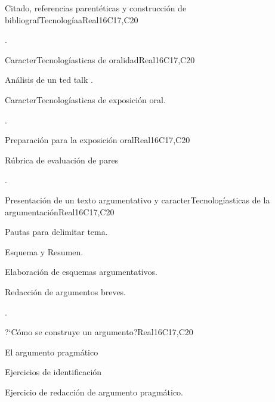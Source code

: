 \begin{syllabus}
\begin{unit}{Citado, referencias parentéticas y construcción de bibliografTecnologíaa}{}{Real}{16}{C17,C20}
  \begin{learningoutcomes}
   \item .%
  \end{learningoutcomes}
\end{unit}

\begin{unit}{CaracterTecnologíasticas de oralidad}{}{Real}{16}{C17,C20}
  \begin{topics}
      \item Análisis de un ted talk .
      \item CaracterTecnologíasticas de exposición oral.
  \end{topics}

  \begin{learningoutcomes}
   \item .%
  \end{learningoutcomes}
\end{unit}

\begin{unit}{Preparación para la exposición oral}{}{Real}{16}{C17,C20}
  \begin{topics}
      \item Rúbrica de evaluación de pares
  \end{topics}

  \begin{learningoutcomes}
   \item .%
  \end{learningoutcomes}
\end{unit}

\begin{unit}{Presentación de un texto argumentativo y caracterTecnologíasticas de la argumentación}{}{Real}{16}{C17,C20}
  \begin{topics}
      \item Pautas para delimitar tema.
      \item Esquema y Resumen.
      \item Elaboración de esquemas argumentativos.
      \item Redacción de argumentos breves.
  \end{topics}

  \begin{learningoutcomes}
   \item .%
  \end{learningoutcomes}
\end{unit}

\begin{unit}{?`Cómo se construye un argumento?}{}{Real}{16}{C17,C20}
  \begin{topics}
      \item El argumento pragmático
      \item Ejercicios de identificación 
      \item Ejercicio de redacción de argumento pragmático.
  \end{topics}


\end{unit}
\end{syllabus}
